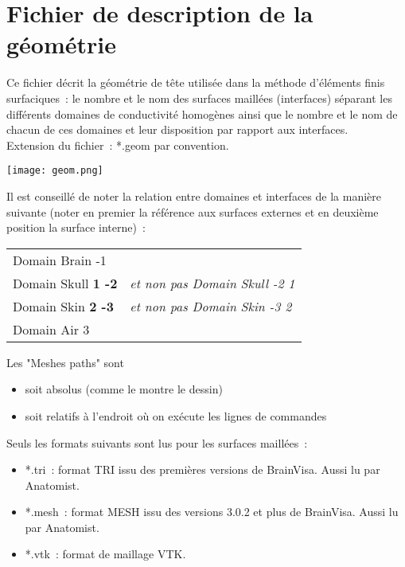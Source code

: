 \section{Fichier de description de la géométrie}
\label{sec:geom}

\noindent
Ce fichier décrit la géométrie de tête utilisée dans la méthode d'éléments finis surfaciques~: le nombre et le nom des surfaces maillées (interfaces) séparant les différents domaines de
conductivité homogènes ainsi que le nombre et le nom de chacun de ces domaines et leur disposition par rapport aux interfaces.\\ 
Extension du fichier~: *.geom par convention. 

\centerline{\texttt{[image: geom.png]}}

\begin{note}
    Il est conseillé de noter la relation entre domaines et interfaces de la manière
    suivante (noter en premier la référence aux surfaces externes et en deuxième position la surface interne)~:

    \begin{tabular}{ll}
        Domain Brain -1              & \\
        Domain Skull \textbf{1 -2}	 &	\emph{et non pas Domain Skull -2 1} \\
        Domain Skin \textbf{2 -3}	 &	\emph{et non pas Domain Skin -3 2}  \\
        Domain Air 3                 &  \\
    \end{tabular}
\end{note}

\medskip

\begin{note}
    Les "Meshes paths" sont 
    \begin{itemize}
        \item soit absolus (comme le montre le dessin)
        \item soit relatifs à l'endroit où on exécute les lignes de commandes 
    \end{itemize}
    Seuls les formats suivants sont lus pour les surfaces maillées~:
    \begin{itemize}
        \item *.tri~: format TRI issu des premières versions de BrainVisa. Aussi lu par Anatomist.
        \item *.mesh~: format MESH issu des versions 3.0.2 et plus de BrainVisa. Aussi lu par Anatomist.
        \item *.vtk~: format de maillage VTK.
    \end{itemize}
\end{note}

